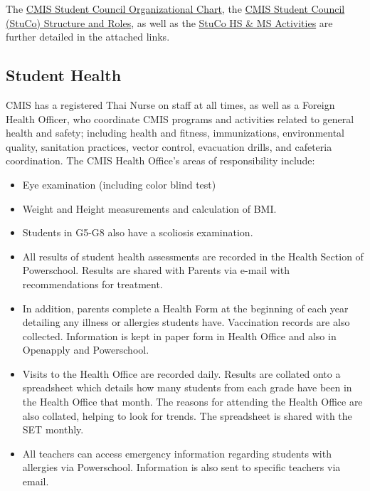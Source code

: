 The \href{https://docs.google.com/a/cmis.ac.th/spreadsheets/d/1Dew5VG0EEek2lvCfLnK5dQa1G-KFTZV3qzR0FFJW1hA/edit?usp=sharing}{CMIS Student Council Organizational Chart}, the \href{https://docs.google.com/document/d/1eQY8B1nPq12prl7nvG42gDSqu9BSYTu-HvTZ22xnCjE/edit?usp=sharing}{CMIS Student Council (StuCo) Structure and Roles}, as well as the \href{https://docs.google.com/document/d/1jyWCNvdDBbUYXTOtACMD4BrgnmwtGNdOdigtEbqqMuM/edit?usp=sharing}{StuCo HS \& MS Activities} are further detailed in the attached links.  

\subsection{Student Health}

CMIS has a registered Thai Nurse on staff at all times, as well as a Foreign Health Officer, who coordinate CMIS programs and activities related to general health and safety; including health and fitness, immunizations, environmental quality, sanitation practices, vector control, evacuation drills, and cafeteria coordination.  The CMIS Health Office’s areas of responsibility include:

\begin{itemize}
\item Eye examination (including color blind test)
\item Weight and Height measurements and calculation of BMI. 
\item Students in G5-G8 also have a scoliosis examination. 
\end{itemize}


\begin{itemize}
\item All results of student health assessments are recorded in the Health Section of Powerschool. Results are shared with Parents via e-mail with recommendations for treatment.
\item In addition, parents complete a Health Form at the beginning of each year detailing any illness or allergies students have. Vaccination records are also collected. Information is kept in paper form in Health Office and also in Openapply and Powerschool.
\item Visits to the Health Office are recorded daily. Results are collated onto a spreadsheet which details how many students from each grade have been in the Health Office that month. The reasons for attending the Health Office are also collated, helping to look for trends. The spreadsheet is shared with the SET monthly.
\item All teachers can access emergency information regarding students with allergies via Powerschool. Information is also sent to specific teachers via email.
\end{itemize}


